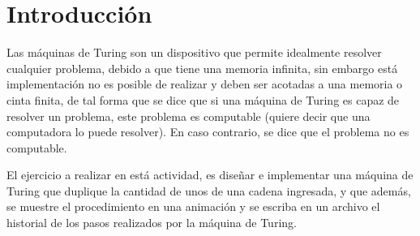 \section{Introducción}
	Las máquinas de Turing son un dispositivo que permite idealmente resolver cualquier problema, debido a que tiene una memoria infinita, sin embargo está implementación no es posible de realizar y deben ser acotadas a una memoria o cinta finita, de tal forma que se dice que si una máquina de Turing es capaz de resolver un problema, este problema es computable (quiere decir que una computadora lo puede resolver). En caso contrario, se dice que el problema no es computable.\cite{LIBRO}

	El ejercicio a realizar en está actividad, es diseñar e implementar una máquina de Turing que duplique la cantidad de unos de una cadena ingresada, y que además, se muestre el procedimiento en una animación y se escriba en un archivo el historial de los pasos realizados por la máquina de Turing.


